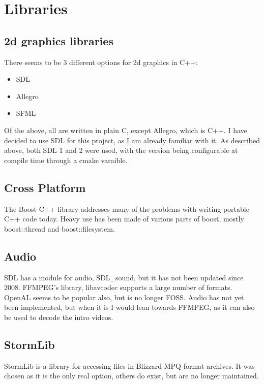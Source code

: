    	\section{Libraries}
       	\subsection{2d graphics libraries}
    	There seems to be 3 different options for 2d graphics in C++:
    	\begin{itemize}
    	    \item{SDL}
    	    \item{Allegro}
    	    \item{SFML}
    	\end{itemize}
    	
    	Of the above, all are written in plain C, except Allegro, which is C++.
    	I have decided to use SDL for this project, as I am already familiar with it.
    	As described above, both SDL 1 and 2 were used, with the version being configurable at compile time through a cmake varaible.
    	
    	\subsection{Cross Platform}
        The Boost C++ library addresses many of the problems with writing portable C++ code today.
     	Heavy use has been made of various parts of boost, mostly boost::thread and boost::filesystem.
        
        \subsection{Audio}
        SDL has a module for audio, SDL\_sound\cite{sdls}, but it has not been updated since 2008.
        FFMPEG's library, libavcodec\cite{libavcodec} supports a large number of formats.
        OpenAL seems to be popular also, but is no longer FOSS.
        Audio has not yet been implemented, but when it is I would lean towards FFMPEG, as it can also be used to decode the intro videos.
        
        \subsection{StormLib}
        StormLib\cite{stormlib} is a library for accessing files in Blizzard MPQ format archives.
        It was chosen as it is the only real option, others do exist, but are no longer maintained.
